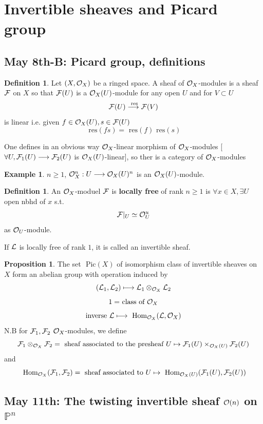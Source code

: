 \documentclass[11pt]{article}
\theoremstyle{definition}
\newtheorem{prop}[thm]{Proposition}
\newtheorem{dfn}[thm]{Definition}
\newtheorem{ex}[thm]{Example}
\renewcommand{\hom}{\text{ Hom}}
\newcommand{\pic}{\text{ Pic}}
\newcommand{\res}{\text{ res}}
\newcommand{\proj}{\mathbb P}
\newcommand{\calf}{{\cal F}}
\newcommand{\call}{{\cal L}}
\newcommand{\calo}{{\cal O}}
\newcommand{\lrta}{\longrightarrow}
\begin{document}
\section{Invertible sheaves and Picard group}
\subsection{May 8th-B: Picard group, definitions}
\begin{dfn}
Let $(X,\calo_X)$ be a ringed space. A sheaf of $\calo_X$-modules is a sheaf
$\calf$ on $X$ so that $\calf(U)$ is a $\calo_X(U)$-module for any open $U$ and for $V\subset U$
$$
\calf(U)\overset{\res}{\lrta}\calf(V)
$$
is linear i.e. given $f\in \calo_X(U), s\in \calf(U)$
$$
\res (f s)=\res(f)\res(s)
$$
\end{dfn}

One defines in an obvious way $\calo_X$-linear morphism of $\calo_X$-modules
[$\forall U, \calf_1(U)\lrta\calf_2(U)$ is $\calo_X(U)$-linear], so ther is a category of $\calo_X$-modules
\begin{ex}
$n\geq 1$, $\calo_X^n:U\lrta \calo_X(U)^n$ is an $\calo_X(U)$-module. 
\end{ex}
\begin{dfn}
An $\calo_X$-moduel $\calf$ is \textbf{locally free} of rank $n\geq 1$ is $\forall x\in X,\exists U $ open nbhd of $x $ s.t.
$$
\calf|_U\simeq \calo_U^u
$$
as $\calo_U$-module.
\end{dfn}

If $\call$ is  locally free of rank $1$, it is called an invertible sheaf.
\begin{prop}
The set $\pic(X)$ of isomorphism class of invertible sheaves on $X$ form  an abelian group with operation induced by 
$$
(\call_1,\call_2)\longmapsto \call_1\otimes_{\calo_X}\call_2
$$
$$
\text{$1=$ class of $\calo_X$}
$$
$$
\text{inverse }
\call\longmapsto \hom_{\calo_X}(\call,\calo_X)
$$
N.B for $\calf_1,\calf_2$ $\calo_X$-modules, we define
$$
\calf_1\otimes_{\calo_X}\calf_2=\text{ sheaf associated to  the presheaf $U\mapsto \calf_1(U)\times_{\calo_X(U)}\calf_2(U)$}
$$
and
$$
\hom_{\calo_X}(\calf_1,\calf_2)=\text{ sheaf associated to $U\mapsto \hom_{\calo_X(U)}(\calf_1(U),\calf_2(U))$}
$$
\end{prop}


\subsection{May 11th: The twisting invertible sheaf $\calo(n)$ on $\proj^n$}
\end{document}
